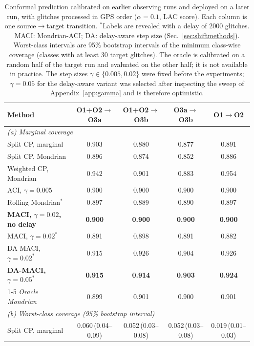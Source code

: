 \begin{table}[!htbp]
\caption{Conformal prediction calibrated on earlier observing runs and deployed on a later run, with glitches processed in GPS
order ($\alpha=0.1$, LAC score). Each column is one source$\rightarrow$target transition. $^{\ast}$Labels are revealed with a delay of
2000 glitches. MACI: Mondrian-ACI; DA: delay-aware step size (Sec.~\ref{sec:shiftmethods}). Worst-class intervals are 95\% bootstrap intervals of the
minimum class-wise coverage (classes with at least 30 target glitches). The oracle is calibrated on a random half of the target run and
evaluated on the other half; it is not available in practice. The step sizes $\gamma\in\{0.005,0.02\}$ were fixed before the
experiments; $\gamma=0.05$ for the delay-aware variant was selected after inspecting the sweep of Appendix~\ref{app:gamma} and is
therefore optimistic.}\label{tab:e2}
\centering\scriptsize\setlength{\tabcolsep}{1.8pt}
\begin{tabular}{lcccc}\toprule
Method & O1+O2$\rightarrow$O3a & O1+O2$\rightarrow$O3b & O3a$\rightarrow$O3b & O1$\rightarrow$O2\\\midrule
\multicolumn{5}{l}{\emph{(a) Marginal coverage}}\\
Split CP, marginal & 0.903 & 0.880 & 0.877 & 0.891\\
Split CP, Mondrian & 0.896 & 0.874 & 0.852 & 0.886\\
Weighted CP, Mondrian & 0.942 & 0.901 & 0.883 & 0.954\\
ACI, $\gamma=0.005$ & 0.900 & 0.900 & 0.900 & 0.900\\
Rolling Mondrian$^{\ast}$ & 0.897 & 0.889 & 0.890 & 0.897\\
\textbf{MACI, $\gamma=0.02$, no delay} & \textbf{0.900} & \textbf{0.900} & \textbf{0.900} & \textbf{0.900}\\
MACI, $\gamma=0.02^{\ast}$ & 0.891 & 0.898 & 0.891 & 0.882\\
DA-MACI, $\gamma=0.02^{\ast}$ & 0.915 & 0.926 & 0.904 & 0.926\\
\textbf{DA-MACI, $\gamma=0.05^{\ast}$} & \textbf{0.915} & \textbf{0.914} & \textbf{0.903} & \textbf{0.924}\\
\cmidrule(l){1-5}
\emph{Oracle Mondrian} & 0.899 & 0.901 & 0.900 & 0.901\\
\midrule
\multicolumn{5}{l}{\emph{(b) Worst-class coverage (95\% bootstrap interval)}}\\
Split CP, marginal & 0.060\,{\tiny(0.04--0.09)} & 0.052\,{\tiny(0.03--0.08)} & 0.052\,{\tiny(0.03--0.08)} & 0.019\,{\tiny(0.01--0.03)}\\

\end{tabular}
\end{table}
